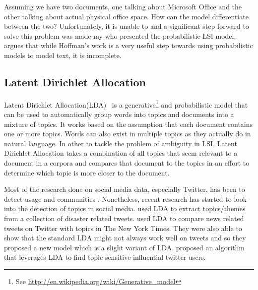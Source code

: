 Assuming we have two documents, one talking about Microsoft Office and the other talking about
actual physical office space. How can the model differentiate between the two? Unfortunately, it is
unable to and a significant step forward to solve this problem was made my
\citet{hofmann1999probabilistic} who presented the probabilistic LSI model. \citet{blei2003latent}
argues that while Hoffman's work is a very useful step towards using probabilistic models to model
text, it is incomplete.

\subsection{Latent Dirichlet Allocation}
\label{sub:bg_lda}
Latent Dirichlet Allocation(LDA)~\citet{blei2003latent} is a generative\footnote{See
\url{http://en.wikipedia.org/wiki/Generative_model}} and probabilistic model that can be used to
automatically group words into topics and documents into a mixture of topics. It works based on the
assumption that each document contains one or more topics. Words can also exist in multiple topics
as they actually do in natural language. In other to tackle the problem of ambiguity in LSI, Latent
Dirichlet Allocation takes a combination of all topics that seem relevant to a document in a corpora
and compares that document to the topics in an effort to determine which topic is more closer to the
document.

Most of the research done on social media data, especially Twitter, has been to detect usage and
communities \citep{java2007we}. Nonetheless, recent research has started to look into the detection
of topics in social media. \citet{kireyev2009applications} used LDA to extract topics/themes from a
collection of disaster related tweets. \citet{zhao2011comparing} used LDA to compare news related
tweets on Twitter with topics in The New York Times. They were also able to show that the standard
LDA might not always work well on tweets and so they proposed a new model which is a slight variant
of LDA. \citet{weng2010twitterrank} proposed an algorithm that leverages LDA to find topic-sensitive
influential twitter users.

